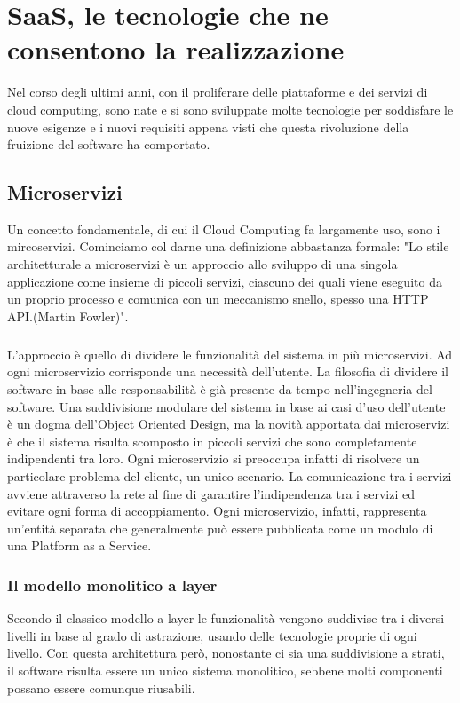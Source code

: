 \chapter{SaaS, le tecnologie che ne consentono la realizzazione}
Nel corso degli ultimi anni, con il proliferare delle piattaforme e dei servizi di cloud computing, sono nate e si sono sviluppate molte tecnologie per soddisfare le nuove esigenze e i nuovi requisiti appena visti che questa rivoluzione della fruizione del software ha comportato.

\section{Microservizi}
Un concetto fondamentale, di cui il Cloud Computing fa largamente uso, sono i mircoservizi. Cominciamo col darne una definizione abbastanza formale: "Lo stile architetturale a microservizi è un approccio allo sviluppo di una singola applicazione come insieme di piccoli servizi, ciascuno dei quali viene eseguito da un proprio processo e comunica con un meccanismo snello, spesso una HTTP API.(Martin Fowler)".

\paragraph{}
L'approccio è quello di dividere le funzionalità del sistema in più microservizi. Ad ogni microservizio corrisponde una necessità dell'utente. La filosofia di dividere il software in base alle responsabilità è già presente da tempo nell'ingegneria del software. Una suddivisione modulare del sistema in base ai casi d'uso dell'utente è un dogma dell'Object Oriented Design, ma la novità apportata dai microservizi è che il sistema risulta scomposto in piccoli servizi che sono completamente indipendenti tra loro. Ogni microservizio si preoccupa infatti di risolvere un particolare problema del cliente, un unico scenario. La comunicazione tra i servizi avviene attraverso la rete al fine di garantire l'indipendenza tra i servizi ed evitare ogni forma di accoppiamento. Ogni microservizio, infatti, rappresenta un'entità separata che generalmente può essere pubblicata come un modulo di una Platform as a Service.

\subsection{Il modello monolitico a layer }
Secondo il classico modello a layer le funzionalità vengono suddivise tra i diversi livelli in base al grado di astrazione, usando delle tecnologie proprie di ogni livello. Con questa architettura però, nonostante ci sia una suddivisione a strati, il software risulta essere un unico sistema monolitico, sebbene molti componenti possano essere comunque riusabili.

